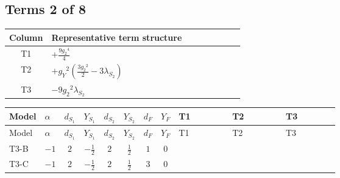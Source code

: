 \documentclass[8pt]{article}
\begin{document}
\begin{landscape}
\subsection*{Terms 2 of 8}
\begin{center}
\begin{tabular}{@{}c >{\raggedright\arraybackslash}p{0.82\linewidth}@{}}
\toprule
Column & Representative term structure \\
\midrule
T1 & \(\displaystyle +\frac{9 {g_2}^4}{4}\) \\
\midrule
T2 & \(\displaystyle +{g_Y}^2 \left(\frac{3 {g_2}^2}{2}-3 {\lambda_{S_2}}\right)\) \\
\midrule
T3 & \(\displaystyle -9 {g_2}^2 {\lambda_{S_2}}\) \\
\midrule
\bottomrule
\end{tabular}
\end{center}
\smallskip
\tiny
\begin{longtable}{@{}llcccccc >{\raggedright\arraybackslash}p{0.21\linewidth} >{\raggedright\arraybackslash}p{0.21\linewidth} >{\raggedright\arraybackslash}p{0.21\linewidth}@{}}
\toprule
Model & $\alpha$ & $d_{S_1}$ & $Y_{S_1}$ & $d_{S_2}$ & $Y_{S_2}$ & $d_F$ & $Y_F$ & T1 & T2 & T3 \\
\midrule
\endfirsthead
\toprule
Model & $\alpha$ & $d_{S_1}$ & $Y_{S_1}$ & $d_{S_2}$ & $Y_{S_2}$ & $d_F$ & $Y_F$ & T1 & T2 & T3 \\
\midrule
\endhead
T3-B & $-1$ & $2$ & $-\frac{1}{2}$ & $2$ & $\frac{1}{2}$ & $1$ & $0$ & \scriptsize\adjustbox{max width=\linewidth}{$\begin{gathered} +\frac{9 {g_2}^4}{4}\end{gathered}$} & \scriptsize\adjustbox{max width=\linewidth}{$\begin{gathered} +{g_Y}^2 \left(\frac{3 {g_2}^2}{2}-3 {\lambda_{S_2}}\right)\end{gathered}$} & \scriptsize\adjustbox{max width=\linewidth}{$\begin{gathered} -9 {g_2}^2 {\lambda_{S_2}}\end{gathered}$} \\
\midrule
T3-C & $-1$ & $2$ & $-\frac{1}{2}$ & $2$ & $\frac{1}{2}$ & $3$ & $0$ & \scriptsize\adjustbox{max width=\linewidth}{$\begin{gathered} +\frac{9 {g_2}^4}{4}\end{gathered}$} & \scriptsize\adjustbox{max width=\linewidth}{$\begin{gathered} +{g_Y}^2 \left(\frac{3 {g_2}^2}{2}-3 {\lambda_{S_2}}\right)\end{gathered}$} & \scriptsize\adjustbox{max width=\linewidth}{$\begin{gathered} -9 {g_2}^2 {\lambda_{S_2}}\end{gathered}$} \\

\end{longtable}
\end{landscape}
\end{document}
